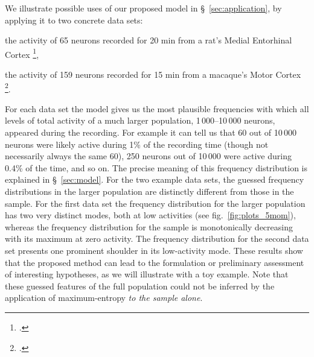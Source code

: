 \documentclass[\ifafour a4paper,12pt,\else a5paper,10pt,\fi%
onecolumn,oneside,article,%
british%
]{memoir}
\theoremstyle{remark}
\theoremstyle{innote}
\newcommand*{\citep}{\footcites}
\renewcommand*{\|}{\nonscript\,\vert\nonscript\;\mathopen{}}
\newcommand*{\sect}{\S}%
\newcommand*{\fig}{fig.}%
\begin{document}
We illustrate possible uses of our proposed model in
\sect~\ref{sec:application}, by applying it to two concrete data sets:
\begin{enumerate*}[label=(\alph*)]
\item the activity of 65 neurons recorded for 20 min from a rat's Medial
  Entorhinal Cortex \citep{stensolaetal2012}, \item the activity of 159
  neurons recorded for 15 min from a macaque's Motor Cortex
  \citep{rostamietal2016_r2017}.
\end{enumerate*}
For each data set the model gives us the most plausible frequencies with
which all levels of total activity of a much larger population,
1\,000--10\,000 neurons, appeared during the recording. For example it can
tell us that 60 out of 10\,000 neurons were likely active during 1\% of the
recording time (though not necessarily always the same 60), 250 neurons out
of 10\,000 were active during 0.4\% of the time, and so on. The precise
meaning of this frequency distribution is explained in
\sect~\ref{sec:model}. For the two example data sets, the guessed frequency
distributions in the larger population are distinctly different from those
in the sample. For the first data set the frequency distribution for the
larger population has two very distinct modes, both at low
activities %
(see \fig~\ref{fig:plots_5mom}), whereas the frequency distribution for the
sample is monotonically decreasing with its maximum at zero activity. The
frequency distribution for the second data set presents one prominent
shoulder in its low-activity mode. These results show that the proposed
method can lead to the formulation or preliminary assessment of interesting
hypotheses, as we will illustrate with a toy example. Note that these
guessed features of the full population could not be inferred by the
application of maximum-entropy \emph{to the sample alone}.

\end{document}

